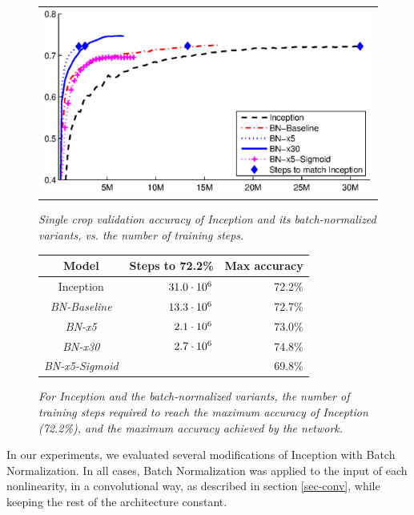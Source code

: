 \documentclass[twocolumn]{article}
\begin{document}
\begin{figure}
\centering
\begin{minipage}[b]{\columnwidth}
\begin{tabular}{@{}c@{}}
\includegraphics[width=\columnwidth]{inception-compare.eps}
\end{tabular} 
\caption{\em Single crop validation accuracy of Inception and its
  batch-normalized variants, vs. the number of training steps.  }
\label{fig-inception}
\end{minipage}
\qquad
%
\begin{minipage}[b]{0.9\columnwidth}
\begin{tabular}{@{} c | r  r  @{}}
\hline
Model & Steps to  72.2\% & Max accuracy \\ 
\hline
Inception& $31.0\cdot 10^6$ & 72.2\%  \\
\sl BN-Baseline& $13.3\cdot 10^6$ & 72.7\%  \\
\sl BN-x5& $2.1\cdot 10^6$ & 73.0\%  \\
\sl BN-x30& $2.7\cdot 10^6$ & 74.8\% \\
\sl BN-x5-Sigmoid&  & 69.8\%\\\hline
\end{tabular}
\caption{\em For Inception and the batch-normalized variants, the number of training steps required to reach the maximum accuracy of Inception (72.2\%), and the maximum accuracy achieved by the network.}
\label{fig-stats}
\end{minipage}
\end{figure}

In our experiments, we evaluated several modifications of Inception with Batch Normalization. In all cases, Batch Normalization was applied to the 
input of each nonlinearity, in a convolutional way, as described in section
\ref{sec-conv}, while keeping the rest of the architecture constant.
\end{document}
